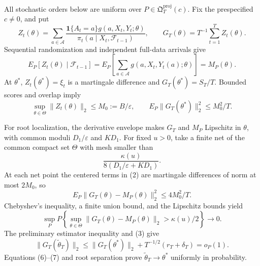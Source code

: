 All stochastic orders below are uniform over \(P\in\mathfrak Q_T^{\mathrm{proj}}(c)\).  Fix the prespecified \(c\ne0\), and put
\[
 Z_t(\theta)=\sum_{a\in\mathcal A}
 \frac{\mathbf1\{A_t=a\}g(a,X_t,Y_t;\theta)}
 {\pi_t(a\mid X_t,\mathcal F_{t-1})},
 \qquad G_T(\theta)=T^{-1}\sum_{t=1}^TZ_t(\theta).
\tag{1}
\]
Sequential randomization and independent full-data arrivals give
\[
 E_P[Z_t(\theta)\mid\mathcal F_{t-1}]
 =E_P\!\left[\sum_{a\in\mathcal A}g(a,X_t,Y_t(a);\theta)\right]
 =M_P(\theta).
\tag{2}
\]
At \(\theta^*\), \(Z_t(\theta^*)=\xi_t\) is a martingale difference and \(G_T(\theta^*)=S_T/T\).  Bounded scores and overlap imply
\[
 \sup_{\theta\in\Theta}\|Z_t(\theta)\|_2\le M_0:=B/\varepsilon,
 \qquad E_P\|G_T(\theta^*)\|_2^2\le M_0^2/T.
\tag{3}
\]

For root localization, the derivative envelope makes \(G_T\) and \(M_P\) Lipschitz in \(\theta\), with common moduli \(D_1/\varepsilon\) and \(KD_1\).  For fixed \(u>0\), take a finite net of the common compact set \(\Theta\) with mesh smaller than
\[
 \frac{\kappa(u)}{8(D_1/\varepsilon+KD_1)}.
\tag{4}
\]
At each net point the centered terms in (2) are martingale differences of norm at most \(2M_0\), so
\[
 E_P\|G_T(\theta)-M_P(\theta)\|_2^2\le4M_0^2/T.
\tag{5}
\]
Chebyshev's inequality, a finite union bound, and the Lipschitz bounds yield
\[
 \sup_P P\!\left\{\sup_{\theta\in\Theta}
 \|G_T(\theta)-M_P(\theta)\|_2>\kappa(u)/2\right\}\longrightarrow0.
\tag{6}
\]
The preliminary estimator inequality and (3) give
\[
 \|G_T(\widetilde\theta_T)\|_2
 \le\|G_T(\theta^*)\|_2+T^{-1/2}(r_T+\delta_T)=o_P(1).
\tag{7}
\]
Equations (6)--(7) and root separation prove \(\widetilde\theta_T\to\theta^*\) uniformly in probability.

